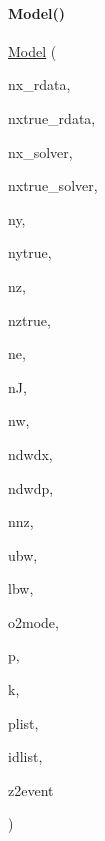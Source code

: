 \paragraph{\texorpdfstring{Model()}{Model()}\hspace{0.1cm}{\footnotesize\ttfamily [2/2]}}
{\footnotesize\ttfamily \mbox{\hyperlink{classamici_1_1_model}{Model}} (\begin{DoxyParamCaption}\item[{const int}]{nx\+\_\+rdata,  }\item[{const int}]{nxtrue\+\_\+rdata,  }\item[{const int}]{nx\+\_\+solver,  }\item[{const int}]{nxtrue\+\_\+solver,  }\item[{const int}]{ny,  }\item[{const int}]{nytrue,  }\item[{const int}]{nz,  }\item[{const int}]{nztrue,  }\item[{const int}]{ne,  }\item[{const int}]{nJ,  }\item[{const int}]{nw,  }\item[{const int}]{ndwdx,  }\item[{const int}]{ndwdp,  }\item[{const int}]{nnz,  }\item[{const int}]{ubw,  }\item[{const int}]{lbw,  }\item[{\mbox{\hyperlink{namespaceamici_a2d77779286167d5603a870bf9f6c21ba}{amici\+::\+Second\+Order\+Mode}}}]{o2mode,  }\item[{const std\+::vector$<$ \mbox{\hyperlink{namespaceamici_a1bdce28051d6a53868f7ccbf5f2c14a3}{amici\+::realtype}} $>$ \&}]{p,  }\item[{std\+::vector$<$ \mbox{\hyperlink{namespaceamici_a1bdce28051d6a53868f7ccbf5f2c14a3}{amici\+::realtype}} $>$}]{k,  }\item[{const std\+::vector$<$ int $>$ \&}]{plist,  }\item[{std\+::vector$<$ \mbox{\hyperlink{namespaceamici_a1bdce28051d6a53868f7ccbf5f2c14a3}{amici\+::realtype}} $>$}]{idlist,  }\item[{std\+::vector$<$ int $>$}]{z2event }\end{DoxyParamCaption})}

